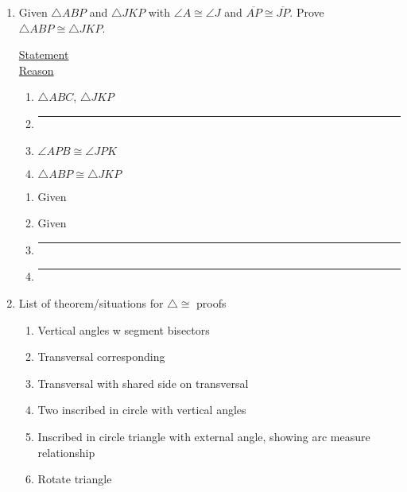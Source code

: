\documentclass[12pt, twoside]{article}
\begin{document}
\begin{enumerate}
     \item Given $\triangle ABP$ and $\triangle JKP$ with $\angle A \cong \angle J$ and $\overline{AP} \cong \overline{JP}$. Prove $\triangle ABP \cong \triangle JKP$.\\[0.5cm]

     \begin{multicols}{2}
       \underline{Statement} \\
       \underline{Reason}
     \end{multicols}
     \begin{multicols}{2}
       \raggedcolumns
       \begin{enumerate}[label={\arabic*)}]
         \item $\triangle ABC$, $\triangle JKP$
         \item \rule{4cm}{0.15mm}%
         \item $\angle APB \cong \angle JPK$ %
 
         \item $\triangle ABP \cong \triangle JKP$
       \end{enumerate}
       \begin{enumerate}[label={\arabic*)}]
         \item Given
         \item Given
         \item \rule{4cm}{0.15mm}
         \item \rule{4cm}{0.15mm}
       \end{enumerate}
     \end{multicols}

\newpage
  \item List of theorem/situations for $\triangle \cong$ proofs
    \begin{enumerate}
      \item Vertical angles w segment bisectors
      \item Transversal corresponding
      \item Transversal with shared side on transversal
      \item Two inscribed in circle with vertical angles
      \item Inscribed in circle triangle with external angle, showing arc measure relationship
      \item Rotate triangle
      \end{enumerate}

\end{enumerate}
\end{document}
